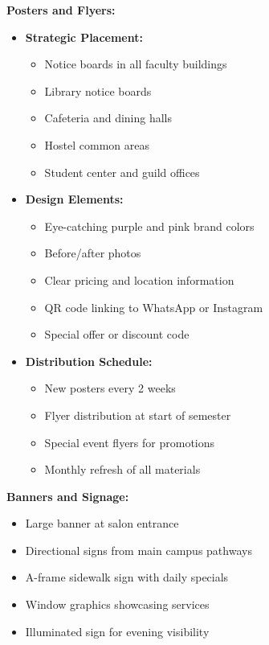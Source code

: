 \documentclass[a4paper,12pt]{article}
\begin{document}
\textbf{Posters and Flyers:}
\begin{itemize}[leftmargin=2em]
    \item \textbf{Strategic Placement:}
    \begin{itemize}
        \item Notice boards in all faculty buildings
        \item Library notice boards
        \item Cafeteria and dining halls
        \item Hostel common areas
        \item Student center and guild offices
    \end{itemize}
    
    \item \textbf{Design Elements:}
    \begin{itemize}
        \item Eye-catching purple and pink brand colors
        \item Before/after photos
        \item Clear pricing and location information
        \item QR code linking to WhatsApp or Instagram
        \item Special offer or discount code
    \end{itemize}
    
    \item \textbf{Distribution Schedule:}
    \begin{itemize}
        \item New posters every 2 weeks
        \item Flyer distribution at start of semester
        \item Special event flyers for promotions
        \item Monthly refresh of all materials
    \end{itemize}
\end{itemize}

\textbf{Banners and Signage:}
\begin{itemize}[leftmargin=2em]
    \item Large banner at salon entrance
    \item Directional signs from main campus pathways
    \item A-frame sidewalk sign with daily specials
    \item Window graphics showcasing services
    \item Illuminated sign for evening visibility
\end{itemize}
\end{document}
